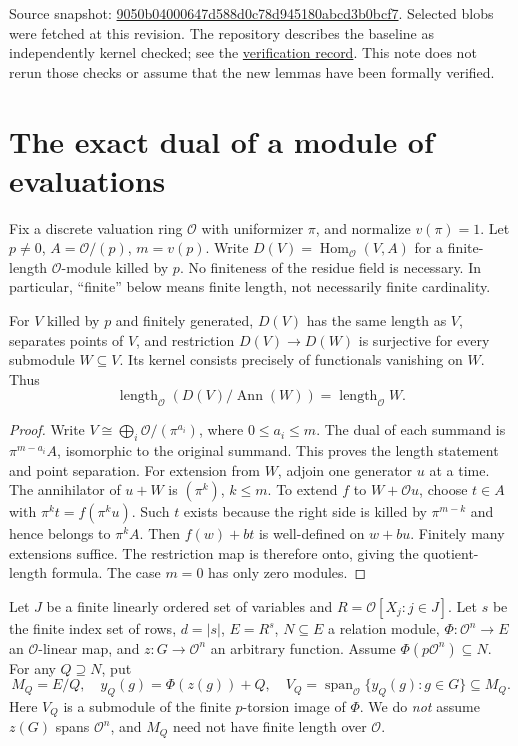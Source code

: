 \documentclass[11pt]{article}
\newcommand{\OO}{\mathcal O}\newcommand{\FF}{\operatorname{Fitt}_0}\newcommand{\len}{\operatorname{length}_{\OO}}\newcommand{\val}{\operatorname{v}}\newcommand{\Hom}{\operatorname{Hom}}\newcommand{\Span}{\operatorname{span}}\newcommand{\code}[1]{\texttt{\detokenize{#1}}}
\begin{document}
Source snapshot: \href{https://github.com/VladimirReshetnikov/ProveIt/tree/9050b04000647d588d0c78d945180abcd3b0bcf7/Analysis/GeneralizedRiemannHypothesis}{9050b04000647d588d0c78d945180abcd3b0bcf7}. Selected blobs were fetched at this revision. The repository describes the baseline as independently kernel checked; see the \href{https://math.mit.edu/~drew/shortgrh/}{verification record}. This note does not rerun those checks or assume that the new lemmas have been formally verified.
\section{The exact dual of a module of evaluations}
Fix a discrete valuation ring $\OO$ with uniformizer $\pi$, and normalize $v(\pi)=1$. Let $p\ne0$, $A=\OO/(p)$, $m=v(p)$. Write $D(V)=\Hom_{\OO}(V,A)$ for a finite-length $\OO$-module killed by $p$. No finiteness of the residue field is necessary. In particular, ``finite'' below means finite length, not necessarily finite cardinality.

\begin{lemma}\label{lem:dual}
For $V$ killed by $p$ and finitely generated, $D(V)$ has the same length as $V$, separates points of $V$, and restriction $D(V)\to D(W)$ is surjective for every submodule $W\subseteq V$. Its kernel consists precisely of functionals vanishing on $W$. Thus
\[
 \len(D(V)/\operatorname{Ann}(W))=\len W.
\]
\end{lemma}
\begin{proof}
Write $V\cong\bigoplus_i\OO/(\pi^{a_i})$, where $0\le a_i\le m$. The dual of each summand is $\pi^{m-a_i}A$, isomorphic to the original summand. This proves the length statement and point separation. For extension from $W$, adjoin one generator $u$ at a time. The annihilator of $u+W$ is $(\pi^k)$, $k\le m$. To extend $f$ to $W+\OO u$, choose $t\in A$ with $\pi^k t=f(\pi^k u)$. Such $t$ exists because the right side is killed by $\pi^{m-k}$ and hence belongs to $\pi^k A$. Then $f(w)+bt$ is well-defined on $w+bu$. Finitely many extensions suffice. The restriction map is therefore onto, giving the quotient-length formula. The case $m=0$ has only zero modules.
\end{proof}

Let $J$ be a finite linearly ordered set of variables and $R=\OO[X_j:j\in J]$. Let $s$ be the finite index set of rows, $d=|s|$, $E=R^s$, $N\subseteq E$ a relation module, $\Phi:\OO^n\to E$ an $\OO$-linear map, and $z:G\to\OO^n$ an arbitrary function. Assume $\Phi(p\OO^n)\subseteq N$. For any $Q\supseteq N$, put
\[
 M_Q=E/Q,\quad y_Q(g)=\Phi(z(g))+Q,\quad
 V_Q=\Span_{\OO}\{y_Q(g):g\in G\}\subseteq M_Q.
\]
Here $V_Q$ is a submodule of the finite $p$-torsion image of $\Phi$. We do \emph{not} assume $z(G)$ spans $\OO^n$, and $M_Q$ need not have finite length over $\OO$.
\end{document}
